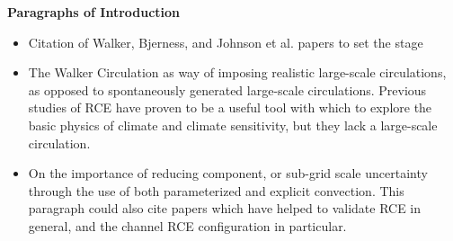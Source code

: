 \documentclass[11pt]{article}   	%
\begin{document}
%
%
\textbf{Paragraphs of Introduction}
\begin{itemize}
  \item{Citation of Walker, Bjerness, and Johnson et al. papers to set the stage}
  \item{The Walker Circulation as way of imposing realistic large-scale circulations, as opposed to spontaneously generated large-scale
  circulations.  Previous studies of RCE have proven to be a 
  useful tool with which to explore the basic physics of climate and climate sensitivity, but they lack a large-scale circulation.}
  \item{On the importance of reducing component, or sub-grid scale uncertainty through the use of both parameterized and explicit 
  convection.  This paragraph could also cite papers which have helped to validate RCE in general, and the channel RCE configuration
  in particular.}
\end{itemize}
\end{document}
